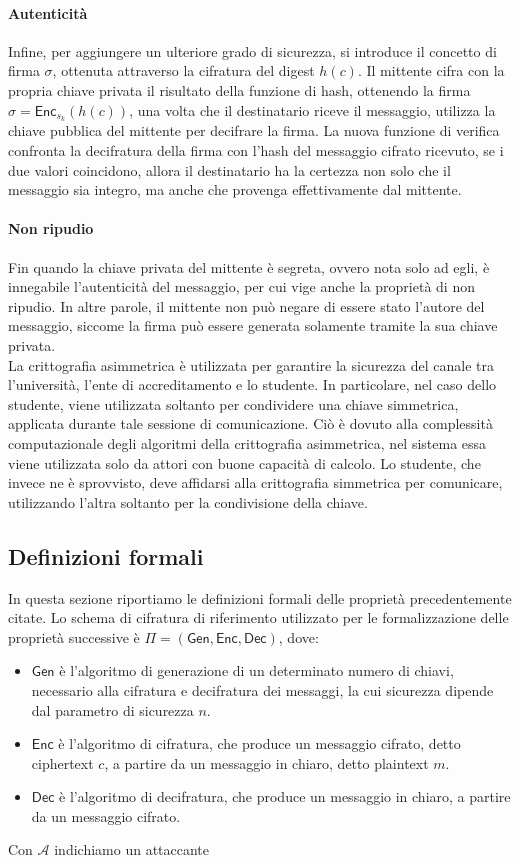 \documentclass[a4paper,12pt]{article}
\begin{document}
\paragraph{Autenticità}
Infine, per aggiungere un ulteriore grado di sicurezza, si introduce il concetto di firma $\sigma$, ottenuta attraverso la cifratura del digest $h(c)$. 
Il mittente cifra con la propria chiave privata il risultato della funzione di hash, ottenendo la firma $\sigma=\mathsf{Enc}_{s_k}(h(c))$, una volta che il destinatario riceve il messaggio, utilizza la chiave pubblica del mittente per decifrare la firma. La nuova funzione di verifica confronta la decifratura della firma con l'hash del messaggio cifrato ricevuto, se i due valori coincidono, allora il destinatario ha la certezza non solo che il messaggio sia integro, ma anche che provenga effettivamente dal mittente.
\paragraph{Non ripudio}
Fin quando la chiave privata del mittente è segreta, ovvero nota solo ad egli, è innegabile l'autenticità del messaggio, per cui vige anche la proprietà di non ripudio. In altre parole, il mittente non può negare di essere stato l'autore del messaggio, siccome la firma può essere generata solamente tramite la sua chiave privata.
\\[1em] La crittografia asimmetrica è utilizzata per garantire la sicurezza del canale tra l'università, l'ente di accreditamento e lo studente. In particolare, nel caso dello studente, viene utilizzata soltanto per condividere una chiave simmetrica, applicata durante tale sessione di comunicazione. Ciò è dovuto alla complessità computazionale degli algoritmi della crittografia asimmetrica, nel sistema essa viene utilizzata solo da attori con buone capacità di calcolo. 
Lo studente, che invece ne è sprovvisto, deve affidarsi alla crittografia simmetrica per comunicare, utilizzando l'altra soltanto per la condivisione della chiave.


\subsection{Definizioni formali}
In questa sezione riportiamo le definizioni formali delle proprietà precedentemente citate. 
\newline 
Lo schema di cifratura di riferimento utilizzato per le formalizzazione delle proprietà successive è $\Pi =\mathsf{(Gen,Enc,Dec)}$, dove: 
\begin{itemize}
    \item $\mathsf{Gen}$ è l'algoritmo di generazione di un determinato numero di chiavi, necessario alla cifratura e decifratura dei messaggi, la cui sicurezza dipende dal parametro di sicurezza $n$.
    \item $\mathsf{Enc}$ è l'algoritmo di cifratura, che produce un messaggio cifrato, detto ciphertext $c$, a partire da un messaggio in chiaro, detto plaintext $m$.
    \item $\mathsf{Dec}$ è l'algoritmo di decifratura, che produce un messaggio in chiaro, a partire da un messaggio cifrato.
\end{itemize}
Con $\mathcal{A}$ indichiamo un attaccante 
\end{document}
